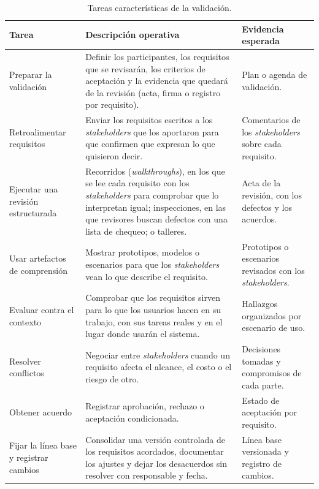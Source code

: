 \documentclass[12pt,letterpaper,oneside]{report}
\begin{document}
\begin{table}[H]
\caption{Tareas características de la validación.}
\label{tab:tareas_validacion}
\centering
\footnotesize
\renewcommand{\arraystretch}{1.12}
\begin{tabularx}{\textwidth}{@{}L{4.0cm}Y L{3.2cm}@{}}
\toprule
\textbf{Tarea} & \textbf{Descripción operativa} & \textbf{Evidencia esperada} \\
\midrule
Preparar la validación & Definir los participantes, los requisitos que se
revisarán, los criterios de aceptación y la evidencia que quedará de la
revisión (acta, firma o registro por requisito). & Plan o agenda de
validación. \\
Retroalimentar requisitos & Enviar los requisitos escritos a los
\textit{stakeholders} que los aportaron para que confirmen que expresan lo que
quisieron decir. & Comentarios de los \textit{stakeholders} sobre cada
requisito. \\
Ejecutar una revisión estructurada & Recorridos (\textit{walkthroughs}), en los
que se lee cada requisito con los \textit{stakeholders} para comprobar que lo
interpretan igual; inspecciones, en las que revisores buscan defectos con una
lista de chequeo; o talleres. & Acta de la revisión, con los defectos y los
acuerdos. \\
Usar artefactos de comprensión & Mostrar prototipos, modelos o escenarios
para que los \textit{stakeholders} vean lo que describe el requisito. &
Prototipos o escenarios revisados con los \textit{stakeholders}. \\
Evaluar contra el contexto & Comprobar que los requisitos sirven para lo que
los usuarios hacen en su trabajo, con sus tareas reales y en el lugar donde
usarán el sistema. & Hallazgos organizados por escenario de uso. \\
Resolver conflictos & Negociar entre \textit{stakeholders} cuando un
requisito afecta el alcance, el costo o el riesgo de otro. & Decisiones
tomadas y compromisos de cada parte. \\
Obtener acuerdo & Registrar aprobación, rechazo o aceptación condicionada. &
Estado de aceptación por requisito. \\
Fijar la línea base y registrar cambios & Consolidar una versión controlada
de los requisitos acordados, documentar los ajustes y dejar los desacuerdos sin
resolver con responsable y fecha. & Línea base versionada y registro de
cambios. \\
\bottomrule
\end{tabularx}
\end{table}
\end{document}
